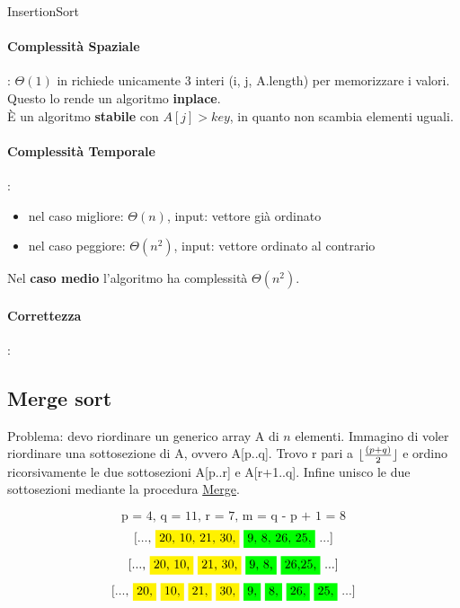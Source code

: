 \documentclass{article}
\DeclarePairedDelimiter\floor{\lfloor}{\rfloor}
\begin{document}
    \begin{algorithm}[H] 
        \caption{InsertionSort\label{IR}}
        \end{algorithm}

\paragraph{Complessità Spaziale}: $\Theta(1)$ in richiede unicamente 3 interi (i, j, A.length)
per memorizzare i valori. Questo lo rende un algoritmo \textbf{inplace}.\\
È un algoritmo \textbf{stabile} con $A[j] > key$, in quanto non scambia elementi uguali.\\


\paragraph{Complessità Temporale}:
\begin{itemize}
    \item nel caso migliore: $\Theta(n)$, input: vettore già ordinato
    \item nel caso peggiore: $\Theta(n^2)$, input: vettore ordinato al contrario
\end{itemize}
Nel \textbf{caso medio} l'algoritmo ha complessità $\Theta(n^2)$. 
\paragraph{Correttezza}:

\newpage
\hypertarget{mergesort}{}\subsection{Merge sort} %
Problema: devo riordinare un generico array A di $n$ elementi. Immagino di voler riordinare una sottosezione di A, ovvero A[p..q].
Trovo r pari a $ \floor{\frac{(p+q)}{2}}$ e ordino ricorsivamente le due sottosezioni A[p..r] e A[r+1..q]. Infine unisco le due sottosezioni 
mediante la procedura \hyperlink{merge}{Merge}.

\[\text{p = 4, q = 11, r = 7, m = q - p + 1 = 8}\] 
\[\text{[..., \colorbox{yellow}{20, 10, 21, 30,} \colorbox{green}{9, 8, 26, 25,} ...]}\]
\[\text{[..., \colorbox{yellow}{20, 10,} \colorbox{yellow}{21, 30,} \colorbox{green}{9, 8,} \colorbox{green}{26,25,} ...]}\]
\[\text{[..., \colorbox{yellow}{20,} \colorbox{yellow}{10,} \colorbox{yellow}{21,} \colorbox{yellow}{30,} \colorbox{green}{9,} \colorbox{green}{8,} \colorbox{green}{26,} \colorbox{green}{25,} ...]}\]
\end{document}
